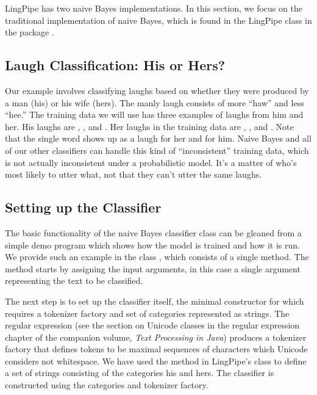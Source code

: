 LingPipe has two naive Bayes implementations.  In this section, we
focus on the traditional implementation of naive Bayes, which is found
in the LingPipe class  in the package
.  

\subsection{Laugh Classification: His or Hers?}

Our example involves classifying laughs based on whether they were
produced by a man (his) or his wife (hers).  The manly laugh consists
of more ``haw'' and less ``hee.''  The training data we will use has
three examples of laughs from him and her.  His laughs are
, , and
.  Her laughs in the training data are
, , and
.  Note that the single word 
shows up as a laugh for her and for him.  Naive Bayes and all of our
other classifiers can handle this kind of ``inconsistent'' training
data, which is not actually inconsistent under a probabilistic model.
It's a matter of who's most likely to utter what, not that they
can't utter the same laughs.

\subsection{Setting up the Classifier}

The basic functionality of the naive Bayes classifier class can be
gleaned from a simple demo program which shows how the model is
trained and how it is run.  We provide such an example in the class
, which consists of a single  method.
The method starts by assigning the input arguments, in this case
a single argument representing the text to be classified.
%

The next step is to set up the classifier itself, the
minimal constructor for which requires a tokenizer factory
and set of categories represented as strings.
%
%
The regular expression  (see
the section on Unicode classes in the regular expression chapter of
the companion volume, {\it Text Processing in Java})
produces a tokenizer factory that
defines tokens to be maximal sequences of characters which Unicode
considers not whitespace.  We have used the  method in
LingPipe's  class to define a set of strings
consisting of the categories his and hers.  The classifier is
constructed using the categories and tokenizer factory.


